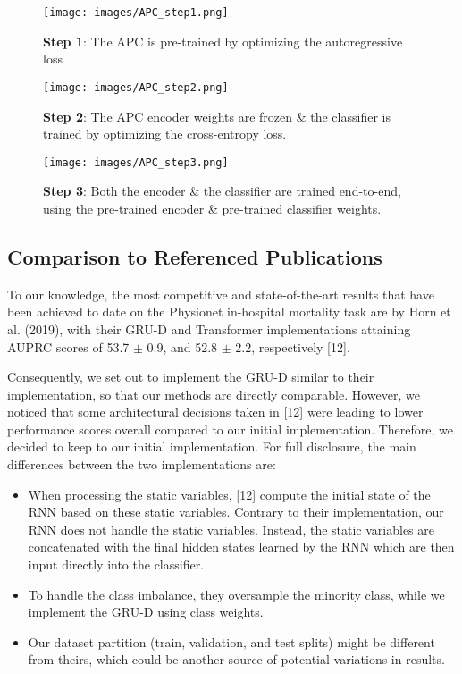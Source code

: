\documentclass{article}
\begin{document}
\begin{figure}[t] 
\centering
\texttt{[image: images/APC\_step1.png]}
\caption{\textbf{Step 1}: The APC is pre-trained by optimizing the autoregressive loss}
\label{apc_step_1}
\end{figure}

\begin{figure}[h] 
\centering
\texttt{[image: images/APC\_step2.png]}
\caption{\textbf{Step 2}: The APC encoder weights are frozen \& the classifier is trained by optimizing the cross-entropy loss.}
\label{apc_step_2}
\end{figure}

\begin{figure}[b] 
\centering
\texttt{[image: images/APC\_step3.png]}
\caption{\textbf{Step 3}: Both the encoder \& the classifier are trained end-to-end, using the pre-trained encoder \& pre-trained classifier weights.}
\label{apc_step_3}
\end{figure}

\clearpage
\subsection{\large Comparison to Referenced Publications}
\vspace{0.5cm}
To our knowledge, the most competitive and state-of-the-art results that have been achieved to date on the Physionet in-hospital mortality task are  by Horn et al. (2019), with their GRU-D and Transformer implementations attaining AUPRC scores of 53.7 $\pm$ 0.9, and 52.8 $\pm$ 2.2, respectively [12].  

Consequently, we set out to implement the GRU-D similar to their implementation, so that our methods are directly comparable.
However, we noticed that some architectural decisions taken in [12] were leading to lower performance scores overall compared to our initial implementation. 
Therefore, we decided to keep to our initial implementation. 
For full disclosure, the main differences between the two implementations are:
\begin{itemize}
    \item When processing the static variables, [12] compute the initial state of the RNN based on these static variables. Contrary to their implementation, our RNN does not handle the static variables. Instead, the static variables are concatenated with the final hidden states learned by the RNN which are then input directly into the classifier.
    \item To handle the class imbalance, they oversample the minority class, while we implement the GRU-D using class weights.
    \item Our dataset partition (train, validation, and test splits) might be different from theirs, which could be another source of potential variations in results.
\end{itemize}
\end{document}
